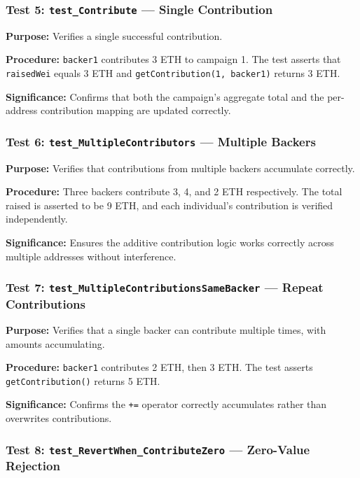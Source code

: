 \subsubsection{Test 5: \texttt{test\_Contribute} --- Single Contribution}

\textbf{Purpose:} Verifies a single successful contribution.

\textbf{Procedure:} \texttt{backer1} contributes 3 ETH to campaign 1. The test asserts that \texttt{raisedWei} equals 3 ETH and \texttt{getContribution(1, backer1)} returns 3 ETH.

\textbf{Significance:} Confirms that both the campaign's aggregate total and the per-address contribution mapping are updated correctly.

\subsubsection{Test 6: \texttt{test\_MultipleContributors} --- Multiple Backers}

\textbf{Purpose:} Verifies that contributions from multiple backers accumulate correctly.

\textbf{Procedure:} Three backers contribute 3, 4, and 2 ETH respectively. The total raised is asserted to be 9 ETH, and each individual's contribution is verified independently.

\textbf{Significance:} Ensures the additive contribution logic works correctly across multiple addresses without interference.

\subsubsection{Test 7: \texttt{test\_MultipleContributionsSameBacker} --- Repeat Contributions}

\textbf{Purpose:} Verifies that a single backer can contribute multiple times, with amounts accumulating.

\textbf{Procedure:} \texttt{backer1} contributes 2 ETH, then 3 ETH. The test asserts \texttt{getContribution()} returns 5 ETH.

\textbf{Significance:} Confirms the \texttt{+=} operator correctly accumulates rather than overwrites contributions.

\subsubsection{Test 8: \texttt{test\_RevertWhen\_ContributeZero} --- Zero-Value Rejection}

